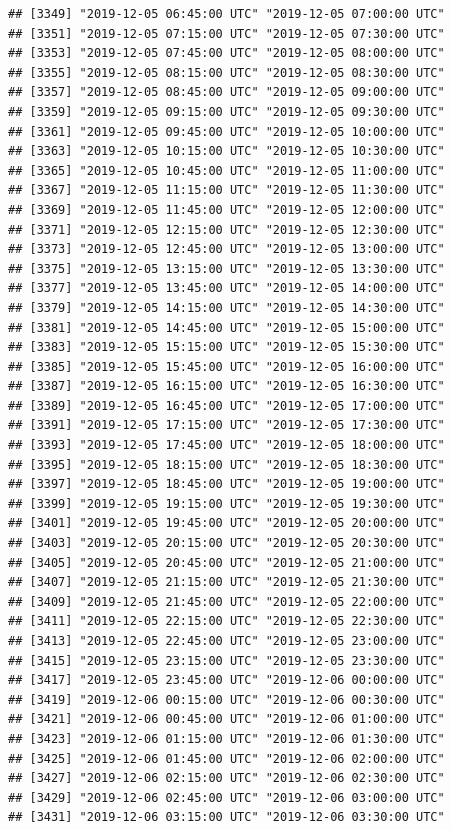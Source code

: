 \documentclass{article}\usepackage[]{graphicx}\usepackage[]{color}
\makeatletter
\newenvironment{kframe}{%
 \def\at@end@of@kframe{}%
 \ifinner\ifhmode%
  \def\at@end@of@kframe{\end{minipage}}%
  \begin{minipage}{\columnwidth}%
 \fi\fi%
 \def\FrameCommand##1{\hskip\@totalleftmargin \hskip-\fboxsep
 \colorbox{shadecolor}{##1}\hskip-\fboxsep
     \hskip-\linewidth \hskip-\@totalleftmargin \hskip\columnwidth}%
 \MakeFramed {\advance\hsize-\width
   \@totalleftmargin\z@ \linewidth\hsize
   \@setminipage}}%
 {\par\unskip\endMakeFramed%
 \at@end@of@kframe}
\newenvironment{knitrout}{}{} %
\makeatother
\begin{document}
\begin{knitrout}
\begin{kframe}
\begin{verbatim}
## [3349] "2019-12-05 06:45:00 UTC" "2019-12-05 07:00:00 UTC"
## [3351] "2019-12-05 07:15:00 UTC" "2019-12-05 07:30:00 UTC"
## [3353] "2019-12-05 07:45:00 UTC" "2019-12-05 08:00:00 UTC"
## [3355] "2019-12-05 08:15:00 UTC" "2019-12-05 08:30:00 UTC"
## [3357] "2019-12-05 08:45:00 UTC" "2019-12-05 09:00:00 UTC"
## [3359] "2019-12-05 09:15:00 UTC" "2019-12-05 09:30:00 UTC"
## [3361] "2019-12-05 09:45:00 UTC" "2019-12-05 10:00:00 UTC"
## [3363] "2019-12-05 10:15:00 UTC" "2019-12-05 10:30:00 UTC"
## [3365] "2019-12-05 10:45:00 UTC" "2019-12-05 11:00:00 UTC"
## [3367] "2019-12-05 11:15:00 UTC" "2019-12-05 11:30:00 UTC"
## [3369] "2019-12-05 11:45:00 UTC" "2019-12-05 12:00:00 UTC"
## [3371] "2019-12-05 12:15:00 UTC" "2019-12-05 12:30:00 UTC"
## [3373] "2019-12-05 12:45:00 UTC" "2019-12-05 13:00:00 UTC"
## [3375] "2019-12-05 13:15:00 UTC" "2019-12-05 13:30:00 UTC"
## [3377] "2019-12-05 13:45:00 UTC" "2019-12-05 14:00:00 UTC"
## [3379] "2019-12-05 14:15:00 UTC" "2019-12-05 14:30:00 UTC"
## [3381] "2019-12-05 14:45:00 UTC" "2019-12-05 15:00:00 UTC"
## [3383] "2019-12-05 15:15:00 UTC" "2019-12-05 15:30:00 UTC"
## [3385] "2019-12-05 15:45:00 UTC" "2019-12-05 16:00:00 UTC"
## [3387] "2019-12-05 16:15:00 UTC" "2019-12-05 16:30:00 UTC"
## [3389] "2019-12-05 16:45:00 UTC" "2019-12-05 17:00:00 UTC"
## [3391] "2019-12-05 17:15:00 UTC" "2019-12-05 17:30:00 UTC"
## [3393] "2019-12-05 17:45:00 UTC" "2019-12-05 18:00:00 UTC"
## [3395] "2019-12-05 18:15:00 UTC" "2019-12-05 18:30:00 UTC"
## [3397] "2019-12-05 18:45:00 UTC" "2019-12-05 19:00:00 UTC"
## [3399] "2019-12-05 19:15:00 UTC" "2019-12-05 19:30:00 UTC"
## [3401] "2019-12-05 19:45:00 UTC" "2019-12-05 20:00:00 UTC"
## [3403] "2019-12-05 20:15:00 UTC" "2019-12-05 20:30:00 UTC"
## [3405] "2019-12-05 20:45:00 UTC" "2019-12-05 21:00:00 UTC"
## [3407] "2019-12-05 21:15:00 UTC" "2019-12-05 21:30:00 UTC"
## [3409] "2019-12-05 21:45:00 UTC" "2019-12-05 22:00:00 UTC"
## [3411] "2019-12-05 22:15:00 UTC" "2019-12-05 22:30:00 UTC"
## [3413] "2019-12-05 22:45:00 UTC" "2019-12-05 23:00:00 UTC"
## [3415] "2019-12-05 23:15:00 UTC" "2019-12-05 23:30:00 UTC"
## [3417] "2019-12-05 23:45:00 UTC" "2019-12-06 00:00:00 UTC"
## [3419] "2019-12-06 00:15:00 UTC" "2019-12-06 00:30:00 UTC"
## [3421] "2019-12-06 00:45:00 UTC" "2019-12-06 01:00:00 UTC"
## [3423] "2019-12-06 01:15:00 UTC" "2019-12-06 01:30:00 UTC"
## [3425] "2019-12-06 01:45:00 UTC" "2019-12-06 02:00:00 UTC"
## [3427] "2019-12-06 02:15:00 UTC" "2019-12-06 02:30:00 UTC"
## [3429] "2019-12-06 02:45:00 UTC" "2019-12-06 03:00:00 UTC"
## [3431] "2019-12-06 03:15:00 UTC" "2019-12-06 03:30:00 UTC"

\end{verbatim}
\end{kframe}
\end{knitrout}
\end{document}
